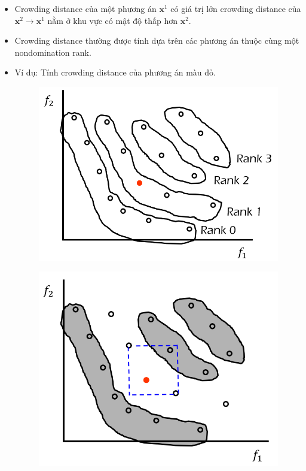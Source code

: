 \documentclass{book}
\begin{document}
\begin{itemize}
    \item Crowding distance của một phương án $\mathbf{x}^1$ có giá trị lớn crowding distance của $\mathbf{x}^2 \rightarrow \mathbf{x}^1$ nằm ở khu vực có mật độ thấp hơn $\mathbf{x}^2$.
    \item Crowding distance thường được tính dựa trên các phương án thuộc cùng một nondomination rank.
    \item Ví dụ: Tính crowding distance của phương án màu đỏ.
    \begin{figure}[H]
        \centering
        \includegraphics[width=0.5\linewidth]{images/GA-7-8_38.png}
    \end{figure}
    \begin{figure}[H]
        \centering
        \includegraphics[width=0.5\linewidth]{images/GA-7-8_39.png}
    \end{figure}
\end{itemize}
\end{document}
